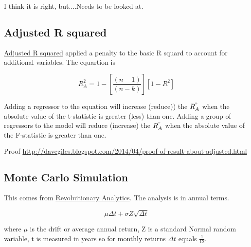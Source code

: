 \documentclass[12pt, a4paper, oneside]{article}\usepackage[]{graphicx}\usepackage[]{color}
\begin{document}
I think it is right, but....Needs to be looked at. 

\subsection{Adjusted R squared}
\href{http://davegiles.blogspot.ca/2013/05/when-will-adjusted-r-squared-increase.html}{Adjusted R squared} applied a penalty to the basic R squard to account for additional variables.  The equartion is 

\begin{equation}
R_A^2 = 1 - \left [ \frac{(n-1)}{(n-k)} \right ] [1 - R^2]
\end{equation}

Adding a regressor to the equation will increase (reduce)) the $R_A^"$ when the absolute value of the t-statistic is greater (less) than one. Adding a group of regressors to the model will reduce (increase) the $R_A^"$ when the absolute value of the F-statistic is greater than one.  

Proof \href{http://davegiles.blogspot.com/2014/04/proof-of-result-about-adjusted.html}{http://davegiles.blogspot.com/2014/04/proof-of-result-about-adjusted.html}

\subsection{Monte Carlo Simulation}
This comes from \href{http://blog.revolutionanalytics.com/2014/04/quantitative-finance-applications-in-r-5.html}{Revoluitionary Analytics}.  The analysis is in annual terms.  

\begin{equation}
\mu \Delta t + \sigma Z \sqrt{\Delta t}
\end{equation}

where $\mu$ is the drift or average annual return, Z is a standard Normal random variable, t is measured in years so for monthly returns $\Delta t$ equals $\frac{1}{12}$.
\end{document}
